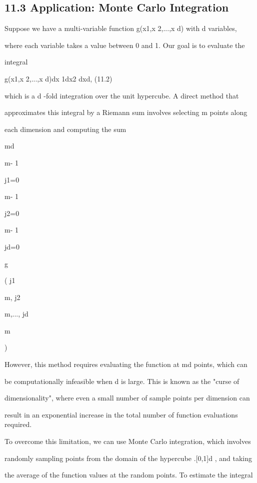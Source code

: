 \subsection*{11.3 Application: Monte Carlo Integration}

Suppose we have a multi-variable function g(x1,x 2,...,x d) with d variables,

where each variable takes a value between 0 and 1. Our goal is to evaluate the

integral



\cdot\cdot\cdot


g(x1,x 2,...,x d)dx 1dx2 \cdot\cdot\cdot dxd, (11.2)

which is a d -fold integration over the unit hypercube. A direct method that

approximates this integral by a Riemann sum involves selecting m points along

each dimension and computing the sum

md

m- 1\sum

j1=0

m- 1\sum

j2=0

\cdot\cdot\cdot

m- 1\sum

jd=0

g

( j1

m, j2

m,..., jd

m

)

However, this method requires evaluating the function at md points, which can

be computationally infeasible when d is large. This is known as the "curse of

dimensionality", where even a small number of sample points per dimension can

result in an exponential increase in the total number of function evaluations required.

To overcome this limitation, we can use Monte Carlo integration, which involves

randomly sampling points from the domain of the hypercube .[0,1]d , and taking

the average of the function values at the random points. To estimate the integral

